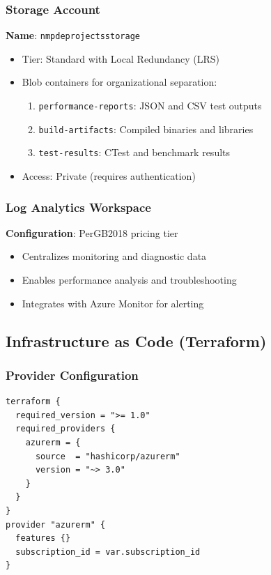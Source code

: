 \documentclass[11pt,a4paper]{article}
\begin{document}
\subsubsection{Storage Account}
\textbf{Name}: \texttt{nmpdeprojectsstorage}
\begin{itemize}
    \item Tier: Standard with Local Redundancy (LRS)
    \item Blob containers for organizational separation:
    \begin{enumerate}
        \item \texttt{performance-reports}: JSON and CSV test outputs
        \item \texttt{build-artifacts}: Compiled binaries and libraries
        \item \texttt{test-results}: CTest and benchmark results
    \end{enumerate}
    \item Access: Private (requires authentication)
\end{itemize}

\subsubsection{Log Analytics Workspace}
\textbf{Configuration}: PerGB2018 pricing tier
\begin{itemize}
    \item Centralizes monitoring and diagnostic data
    \item Enables performance analysis and troubleshooting
    \item Integrates with Azure Monitor for alerting
\end{itemize}

\subsection{Infrastructure as Code (Terraform)}

\subsubsection{Provider Configuration}
\begin{lstlisting}
terraform {
  required_version = ">= 1.0"
  required_providers {
    azurerm = {
      source  = "hashicorp/azurerm"
      version = "~> 3.0"
    }
  }
}
provider "azurerm" {
  features {}
  subscription_id = var.subscription_id
}
\end{lstlisting}
\end{document}
